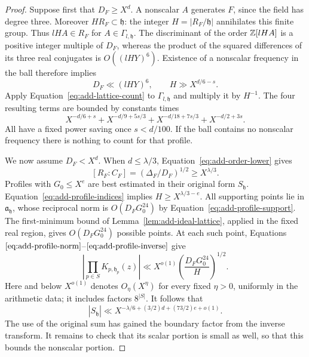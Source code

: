 \begin{proof}
Suppose first that \(D_F\ge X^d\).  A nonscalar \(A\) generates \(F\), since
the field has degree three.  Moreover \(HR_F\subset\mathfrak h\): the
integer \(H=|R_F/\mathfrak h|\) annihilates this finite group.  Thus
\(lHA\in R_F\) for \(A\in\Gamma_{l,\mathfrak h}\).  The discriminant of the
order \(\mathbb Z[lHA]\) is a positive integer multiple of \(D_F\), whereas the
product of the squared differences of its three real conjugates is
\(O((lHY)^6)\).  Existence of a nonscalar frequency in the ball therefore
implies
\[
 D_F\ll(lHY)^6,\qquad H\gg X^{d/6-s}.
\]
Apply Equation~\eqref{eq:add-lattice-count} to
\(\Gamma_{l,\mathfrak h}\) and multiply it by \(H^{-1}\).  The four resulting
terms are bounded by constants times
\begin{equation}
 X^{-d/6+s}
 +X^{-d/9+5s/3}
 +X^{-d/18+7s/3}
 +X^{-d/2+3s}.
 \label{eq:add-large-field}
\end{equation}
All have a fixed power saving once \(s<d/100\).  If the ball contains no
nonscalar frequency there is nothing to count for that profile.

We now assume \(D_F<X^d\).  When \(d\le\lambda/3\),
Equation~\eqref{eq:add-order-lower} gives
\[
 [R_F:C_F]=(\Delta_F/D_F)^{1/2}\ge X^{\lambda/3}.
\]
Profiles with \(G_0\le X^e\) are best estimated in their original form
\(S_{\mathfrak h}\).  Equation~\eqref{eq:add-profile-indices} implies
\(H\ge X^{\lambda/3-e}\).  All supporting points lie in
\(\mathfrak a_{\mathfrak h}\), whose reciprocal norm is
\(O(D_FG_0^{24})\) by Equation~\eqref{eq:add-profile-support}.
The first-minimum bound of Lemma~\ref{lem:add-ideal-lattice}, applied in the
fixed real region, gives \(O(D_FG_0^{24})\) possible points.
At each such point, Equations
\(\eqref{eq:add-profile-norm}\)--\(\eqref{eq:add-profile-inverse}\) give
\[
 \left|\prod_{p\in S}K_{p,\mathfrak h_p}(z)\right|
   \ll X^{o(1)}
        \left(\frac{D_FG_0^{24}}{H}\right)^{1/2}.
\]
Here and below \(X^{o(1)}\) denotes \(O_\eta(X^\eta)\) for every fixed
\(\eta>0\), uniformly in the arithmetic data; it includes factors
\(8^{|S|}\).  It follows that
\begin{equation}
 |S_{\mathfrak h}|
   \ll X^{-\lambda/6+(3/2)d+(73/2)e+o(1)}.
 \label{eq:add-small-index-profile}
\end{equation}
The use of the original sum has gained the boundary factor from the inverse
transform.  It remains to check that its scalar portion is small as well,
so that this bounds the nonscalar portion.


\end{proof}

